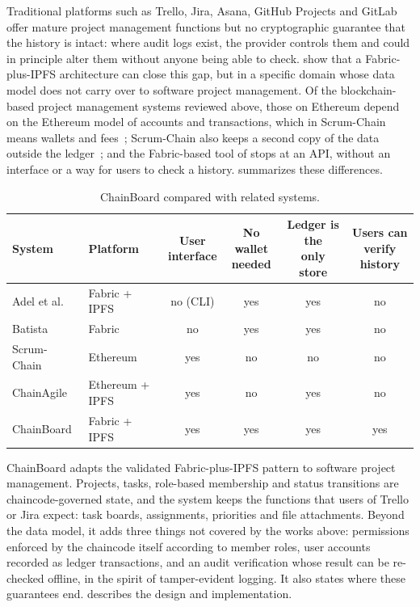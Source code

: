 Traditional platforms such as Trello, Jira, Asana, GitHub Projects and GitLab offer mature project management functions but no cryptographic guarantee that the history is intact: where audit logs exist, the provider controls them and could in principle alter them without anyone being able to check. \textcite{adel2023} show that a Fabric-plus-IPFS architecture can close this gap, but in a specific domain whose data model does not carry over to software project management. Of the blockchain-based project management systems reviewed above, those on Ethereum depend on the Ethereum model of accounts and transactions, which in Scrum-Chain means wallets and fees~\cite{qureshi2024chainagile,silva_scrumchain}; Scrum-Chain also keeps a second copy of the data outside the ledger~\cite{silva_scrumchain}; and the Fabric-based tool of \textcite{batista2021} stops at an API, without an interface or a way for users to check a history.  summarizes these differences.

\begin{table}[!htb]
    \centering
    \small
    \setlength{\tabcolsep}{4pt}
    \begin{tabular}{llcccc}
        \toprule
        System & Platform & \shortstack{User\\interface} & \shortstack{No wallet\\needed} & \shortstack{Ledger is the\\only store} & \shortstack{Users can\\verify history} \\
        \midrule
        Adel et al.~\cite{adel2023} & Fabric + IPFS & no (CLI) & yes & yes & no \\
        Batista~\cite{batista2021} & Fabric & no & yes & yes & no \\
        Scrum-Chain~\cite{silva_scrumchain} & Ethereum & yes & no & no & no \\
        ChainAgile~\cite{qureshi2024chainagile} & Ethereum + IPFS & yes & no & yes & no \\
        ChainBoard & Fabric + IPFS & yes & yes & yes & yes \\
        \bottomrule
    \end{tabular}
    \caption{ChainBoard compared with related systems.}
    \label{tab:related}
\end{table}

ChainBoard adapts the validated Fabric-plus-IPFS pattern to software project management. Projects, tasks, role-based membership and status transitions are chaincode-governed state, and the system keeps the functions that users of Trello or Jira expect: task boards, assignments, priorities and file attachments. Beyond the data model, it adds three things not covered by the works above: permissions enforced by the chaincode itself according to member roles, user accounts recorded as ledger transactions, and an audit verification whose result can be re-checked offline, in the spirit of tamper-evident logging. It also states where these guarantees end.  describes the design and implementation.
